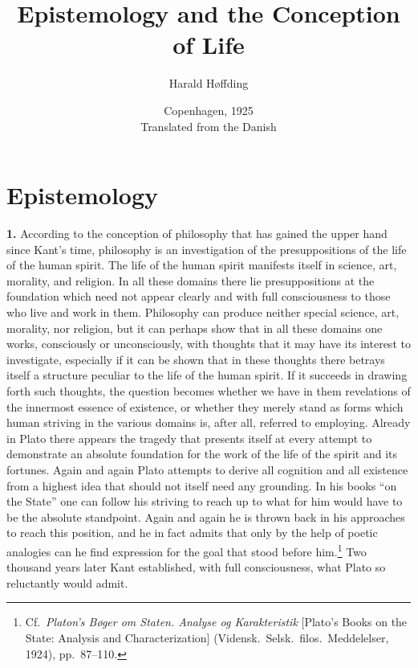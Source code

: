 \documentclass[12pt]{book}
\title{Epistemology and the Conception of Life}
\author{Harald Høffding}
\date{Copenhagen, 1925\\[6pt]
  \small Translated from the Danish}
\newcommand{\hnum}[1]{\textbf{#1.}\enspace}
\newcommand{\opage}[1]{\marginnote{\footnotesize\textit{[#1]}}}
\begin{document}
\maketitle
\tableofcontents

\chapter{Epistemology}
\label{ch:1}

\opage{3}\hnum{1} According to the conception of philosophy that has gained the upper hand since
Kant's time, philosophy is an investigation of the presuppositions of the life of the human spirit.
The life of the human spirit manifests itself in science, art, morality, and religion. In all
these domains there lie presuppositions at the foundation which need not appear clearly and
with full consciousness to those who live and work in them. Philosophy can produce neither
special science, art, morality, nor religion, but it can perhaps show that in all these domains
one works, consciously or unconsciously, with thoughts that it may have its interest to
investigate, especially if it can be shown that in these thoughts there betrays itself a
structure peculiar to the life of the human spirit. If it succeeds in drawing forth such thoughts, the
question becomes whether we have in them revelations of the innermost essence of existence, or
whether they merely stand as forms which human striving in the various domains is, after all,
referred to employing. Already in Plato there appears the tragedy that presents itself at every
attempt to demonstrate an absolute foundation for the work of the life of the spirit and its fortunes.
Again and again Plato attempts to derive all cognition and all existence from a highest idea
that should not itself need any grounding. In his books ``on the State'' one can follow his
striving to reach up to what for him would have to be the absolute standpoint. Again and again
\opage{4}he is thrown back in his approaches to reach this position, and he in fact admits that only by
the help of poetic analogies can he find expression for the goal that stood before
him.\footnote{Cf.\ \textit{Platon's Bøger om Staten. Analyse og Karakteristik} [Plato's Books on
the State: Analysis and Characterization] (Vidensk.\ Selsk.\ filos.\ Meddelelser, 1924), pp.\
87--110.} Two thousand years later Kant established, with full consciousness, what Plato so
reluctantly would admit.
\end{document}
